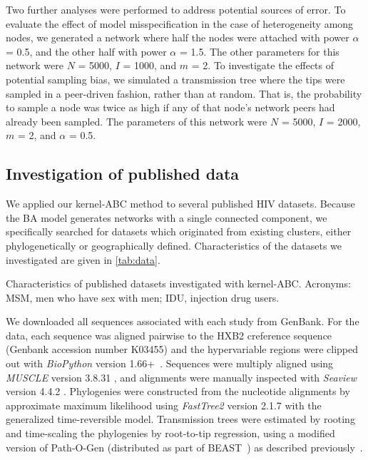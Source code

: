 \documentclass[12pt]{article}\usepackage[]{graphicx}\usepackage[]{color}
\begin{document}
Two further analyses were performed to address potential sources of error. To
evaluate the effect of model misspecification in the case of heterogeneity
among nodes, we generated a network where half the nodes were attached with
power $\alpha$ = 0.5, and the other half with power $\alpha$ = 1.5. The other
parameters for this network were $N$ = 5000, $I$ = 1000, and $m$ = 2. To
investigate the effects of potential sampling bias, we simulated a transmission
tree where the tips were sampled in a peer-driven fashion, rather than at
random. That is, the probability to sample a node was twice as high if any of
that node's network peers had already been sampled. The parameters of this
network were $N$ = 5000, $I$ = 2000, $m$ = 2, and $\alpha$ = 0.5.
  
\subsection{Investigation of published data}
  
We applied our kernel-ABC method to several published HIV datasets. Because the
BA model generates networks with a single connected component, we
specifically searched for datasets which originated from existing clusters,
either phylogenetically or geographically defined. Characteristics of the
datasets we investigated are given in \cref{tab:data}.
  
\begin{table*}[!t]
  \centering
  
  \caption{Characteristics of published datasets investigated with kernel-ABC.
  Acronyms: MSM, men who have sex with men; IDU, injection drug users.}
  \label{tab:data}
\end{table*}

We downloaded all sequences associated with each study from GenBank. For the
\textcite{novitsky2014impact} data, each sequence was aligned pairwise to the HXB2
creference sequence (Genbank accession number K03455) and the hypervariable
regions were clipped out with \textit{BioPython} version
1.66+~\autocite{cock2009biopython}. Sequences were multiply aligned using
\textit{MUSCLE} version 3.8.31 \autocite{edgar2004muscle}, and alignments were
manually inspected with \textit{Seaview} version 4.4.2
\autocite{gouy2010seaview}. Phylogenies were constructed from the nucleotide
alignments by approximate maximum likelihood using \textit{FastTree2} version
2.1.7 with the generalized time-reversible model. Transmission trees were
estimated by rooting and time-scaling the phylogenies by root-to-tip
regression, using a modified version of Path-O-Gen (distributed as part of
BEAST~\autocite{drummond2007beast}) as described
previously~\autocite{poon2015phylodynamic}. 
\end{document}
